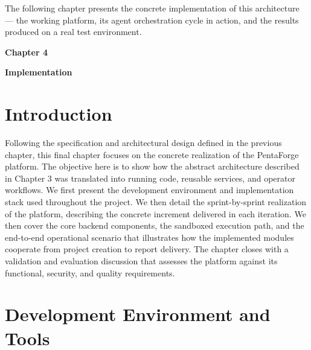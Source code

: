 \documentclass[12pt,a4paper]{report}
\begin{document}
The following chapter presents the concrete implementation of this architecture ---
the working platform, its agent orchestration cycle in action, and the results
produced on a real test environment.

\pagestyle{fancy}
\newpage
\pagestyle{chapterfour}

\vspace*{4cm}

{\fontsize{26}{30}\selectfont \textbf{Chapter 4}}\par

\vspace{1cm}

{\LARGE\bfseries Implementation}

\vspace{0.8cm}

\setcounter{chapter}{4}
\setcounter{section}{0}

\section{Introduction}

Following the specification and architectural design defined in the previous chapter,
this final chapter focuses on the concrete realization of the PentaForge platform.
The objective here is to show how the abstract architecture described in Chapter 3
was translated into running code, reusable services, and operator workflows. We
first present the development environment and implementation stack used throughout
the project. We then detail the sprint-by-sprint realization of the platform,
describing the concrete increment delivered in each iteration. We then cover the
core backend components, the sandboxed execution path, and the end-to-end
operational scenario that illustrates how the implemented modules cooperate from
project creation to report delivery. The chapter closes with a validation and
evaluation discussion that assesses the platform against its functional,
security, and quality requirements.

\section{Development Environment and Tools}
\end{document}
